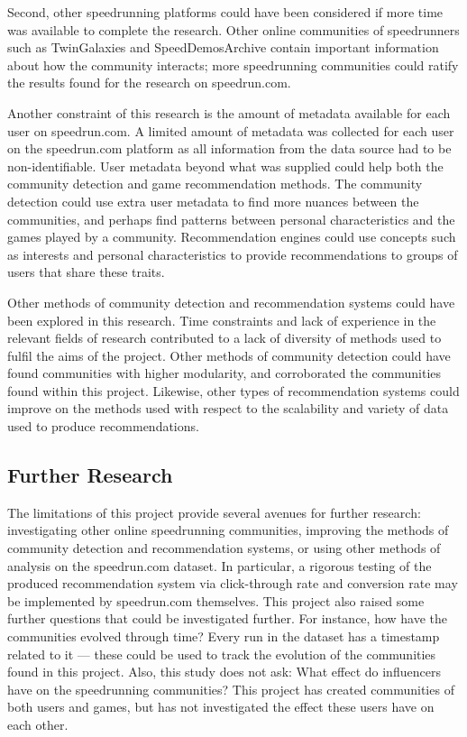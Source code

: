 Second, other speedrunning platforms could have been considered if more time was available to complete the research. Other online communities of speedrunners such as TwinGalaxies and SpeedDemosArchive contain important information about how the community interacts; more speedrunning communities could ratify the results found for the research on speedrun.com. 


Another constraint of this research is the amount of metadata available for each user on speedrun.com. A limited amount of metadata was collected for each user on the speedrun.com platform as all information from the data source had to be non-identifiable. User metadata beyond what was supplied could help both the community detection and game recommendation methods. The community detection could use extra user metadata to find more nuances between the communities, and perhaps find patterns between personal characteristics and the games played by a community. Recommendation engines could use concepts such as interests and personal characteristics to provide recommendations to groups of users that share these traits.


Other methods of community detection and recommendation systems could have been explored in this research. Time constraints and lack of experience in the relevant fields of research contributed to a lack of diversity of methods used to fulfil the aims of the project. Other methods of community detection could have found communities with higher modularity, and corroborated the communities found within this project. Likewise, other types of recommendation systems could improve on the methods used with respect to the scalability and variety of data used to produce recommendations.

\subsection{Further Research}

The limitations of this project provide several avenues for further research: investigating other online speedrunning communities, improving the methods of community detection and recommendation systems, or using other methods of analysis on the speedrun.com dataset. In particular, a rigorous testing of the produced recommendation system via click-through rate and conversion rate may be implemented by speedrun.com themselves. This project also raised some further questions that could be investigated further. For instance, how have the communities evolved through time? Every run in the dataset has a timestamp related to it — these could be used to track the evolution of the communities found in this project. Also, this study does not ask: What effect do influencers have on the speedrunning communities? This project has created communities of both users and games, but has not investigated the effect these users have on each other.